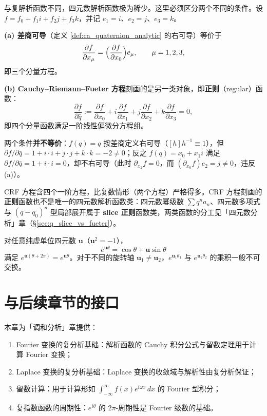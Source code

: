 \begin{remark}[四元数解析函数的稀缺性]\label{rem:ca_quaternion_analytic_rarity}
与复解析函数不同，四元数解析函数极为稀少。这里必须区分两个不同的条件。设 $f = f_0 + f_1 i + f_2 j + f_3 k$，并记 $e_1 = i$、$e_2 = j$、$e_3 = k$。

\textbf{(a) 差商可导}（定义 \ref{def:ca_quaternion_analytic} 的右可导）等价于
\[
\frac{\partial f}{\partial x_\mu} = \Bigl(\frac{\partial f}{\partial x_0}\Bigr) e_\mu, \qquad \mu = 1, 2, 3,
\]
即三个分量方程。

\textbf{(b) Cauchy--Riemann--Fueter 方程}刻画的是另一类对象，即\textbf{正则}（regular）函数：
\[
\frac{\partial f}{\partial \bar{q}} := \frac{\partial f}{\partial x_0} + i \frac{\partial f}{\partial x_1} + j \frac{\partial f}{\partial x_2} + k \frac{\partial f}{\partial x_3} = 0,
\]
即四个分量函数满足一阶线性偏微分方程组。

两个条件\textbf{并不等价}：$f(q) = q$ 按差商定义右可导（$[h]h^{-1} \equiv 1$），但 $\partial f/\partial\bar q = 1 + i\cdot i + j\cdot j + k\cdot k = -2 \neq 0$；反之 $f(q) = x_0 + x_1 i$ 满足 $\partial f/\partial\bar q = 1 + i\cdot i = 0$，却不右可导（此时 $\partial_{x_2}f = 0$，而 $(\partial_{x_0}f)e_2 = j \neq 0$，违反 (a)）。

CRF 方程含四个一阶方程，比复数情形（两个方程）严格得多。CRF 方程刻画的\textbf{正则}函数也不是唯一的四元数解析函数类：四元数幂级数 $\sum q^n a_n$、四元数多项式与 $(q-q_0)^n$ 型局部展开属于 \textbf{slice 正则}函数类，两类函数的分工见「四元数分析」章（\S\ref{sec:q_slice_vs_fueter}）。
\end{remark}

\begin{example}[四元数指数函数的旋转周期性]\label{ex:ca_quaternion_exp}
对任意纯虚单位四元数 $\mathbf{u}$（$\mathbf{u}^2 = -1$），
\[
e^{\mathbf{u}\theta} = \cos\theta + \mathbf{u} \sin\theta
\]
满足 $e^{\mathbf{u}(\theta + 2\pi)} = e^{\mathbf{u}\theta}$。对于不同的旋转轴 $\mathbf{u}_1 \neq \mathbf{u}_2$，$e^{\mathbf{u}_1\theta_1}$ 与 $e^{\mathbf{u}_2\theta_2}$ 的乘积一般不可交换。
\end{example}

\section{与后续章节的接口}

\begin{remark}\label{rem:ca_to_harmonic}
本章为「调和分析」章提供：
\begin{enumerate}[label=(\roman*)]
    \item Fourier 变换的复分析基础：解析函数的 Cauchy 积分公式与留数定理用于计算 Fourier 变换；
    \item Laplace 变换的复分析基础：Laplace 变换的收敛域与解析性由复分析保证；
    \item 留数计算：用于计算形如 $\int_{-\infty}^{\infty} f(x) e^{i\omega x} \, dx$ 的 Fourier 型积分；
    \item 复指数函数的周期性：$e^{i\theta}$ 的 $2\pi$-周期性是 Fourier 级数的基础。
\end{enumerate}
\end{remark}


